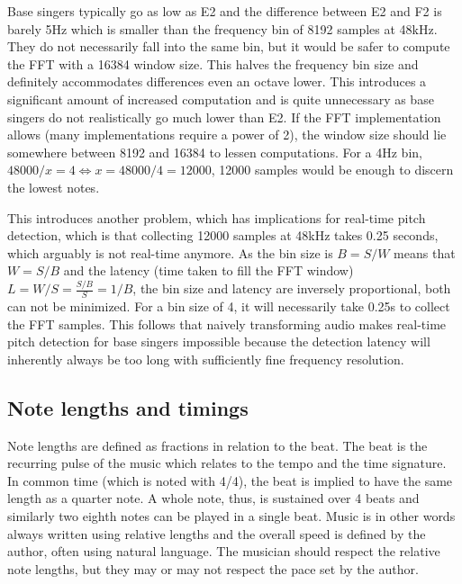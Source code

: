 Base singers typically go as low as E2 and the difference between E2 and F2 is barely 5Hz which is smaller than the frequency bin of 8192 samples at 48kHz. They do not necessarily fall into the same bin, but it would be safer to compute the FFT with a 16384 window size. This halves the frequency bin size and definitely accommodates differences even an octave lower. This introduces a significant amount of increased computation and is quite unnecessary as base singers do not realistically go much lower than E2. If the FFT implementation allows (many implementations require a power of 2), the window size should lie somewhere between 8192 and 16384 to lessen computations. For a 4Hz bin, $48000/x = 4 \iff x = 48000/4 = 12000$, 12000 samples would be enough to discern the lowest notes. 

This introduces another problem, which has implications for real-time pitch detection, which is that collecting 12000 samples at 48kHz takes 0.25 seconds, which arguably is not real-time anymore. As the bin size is $B = S/W$ means that $W = S/B$ and the latency (time taken to fill the FFT window) $L = W/S = \frac{S/B}{S} = 1/B$, the bin size and latency are inversely proportional, both can not be minimized. For a bin size of 4, it will necessarily take 0.25s to collect the FFT samples. This follows that naively transforming audio makes real-time pitch detection for base singers impossible because the detection latency will inherently always be too long with sufficiently fine frequency resolution.

\subsection{Note lengths and timings}
Note lengths are defined as fractions in relation to the beat. The beat is the recurring pulse of the music which relates to the tempo and the time signature. In common time (which is noted with 4/4), the beat is implied to have the same length as a quarter note. A whole note, thus, is sustained over 4 beats and similarly two eighth notes can be played in a single beat. Music is in other words always written using relative lengths and the overall speed is defined by the author, often using natural language. The musician should respect the relative note lengths, but they may or may not respect the pace set by the author.  

